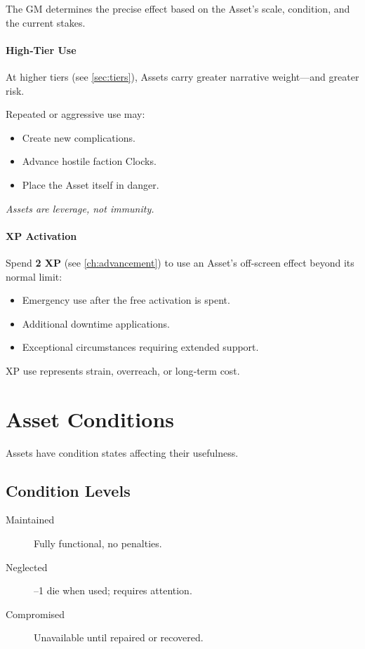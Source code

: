 The GM determines the precise effect based on the Asset’s scale, condition, and the current stakes.

\paragraph{High‑Tier Use}
\label{sec:asset-high-tier}
At higher tiers (see \ref{sec:tiers}), Assets carry greater narrative weight—and greater risk.

Repeated or aggressive use may:
\begin{itemize}
  \item Create new complications.
  \item Advance hostile faction Clocks.
  \item Place the Asset itself in danger.
\end{itemize}
\emph{Assets are leverage, not immunity.}

\paragraph{XP Activation}
\label{sec:asset-xp-activation}
Spend \textbf{2 XP} (see \ref{ch:advancement}) to use an Asset’s off‑screen effect beyond its normal limit:
\begin{itemize}
\item Emergency use after the free activation is spent.
\item Additional downtime applications.
\item Exceptional circumstances requiring extended support.
\end{itemize}
XP use represents strain, overreach, or long‑term cost.

\section{Asset Conditions}
\label{sec:asset-conditions}

Assets have condition states affecting their usefulness.

\subsection*{Condition Levels}
\label{sec:asset-condition-levels}
\begin{description}
\item[Maintained] Fully functional, no penalties.
\item[Neglected] –1 die when used; requires attention.
\item[Compromised] Unavailable until repaired or recovered.
\end{description}

